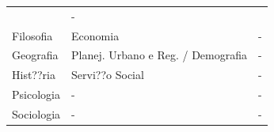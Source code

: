 \documentclass[]{article}
\begin{document}
\begin{longtable}[]{@{}lll@{}}
\begin{minipage}[t]{0.03\columnwidth}
\end{minipage} & \begin{minipage}[t]{0.03\columnwidth}\raggedright\strut
-\strut
\end{minipage}\tabularnewline
\begin{minipage}[t]{0.03\columnwidth}\raggedright\strut
Filosofia\strut
\end{minipage} & \begin{minipage}[t]{0.03\columnwidth}\raggedright\strut
Economia\strut
\end{minipage} & \begin{minipage}[t]{0.03\columnwidth}\raggedright\strut
-\strut
\end{minipage}\tabularnewline
\begin{minipage}[t]{0.03\columnwidth}\raggedright\strut
Geografia\strut
\end{minipage} & \begin{minipage}[t]{0.03\columnwidth}\raggedright\strut
Planej. Urbano e Reg. / Demografia\strut
\end{minipage} & \begin{minipage}[t]{0.03\columnwidth}\raggedright\strut
-\strut
\end{minipage}\tabularnewline
\begin{minipage}[t]{0.03\columnwidth}\raggedright\strut
Hist??ria\strut
\end{minipage} & \begin{minipage}[t]{0.03\columnwidth}\raggedright\strut
Servi??o Social\strut
\end{minipage} & \begin{minipage}[t]{0.03\columnwidth}\raggedright\strut
-\strut
\end{minipage}\tabularnewline
\begin{minipage}[t]{0.03\columnwidth}\raggedright\strut
Psicologia\strut
\end{minipage} & \begin{minipage}[t]{0.03\columnwidth}\raggedright\strut
-\strut
\end{minipage} & \begin{minipage}[t]{0.03\columnwidth}\raggedright\strut
-\strut
\end{minipage}\tabularnewline
\begin{minipage}[t]{0.03\columnwidth}\raggedright\strut
Sociologia\strut
\end{minipage} & \begin{minipage}[t]{0.03\columnwidth}\raggedright\strut
-\strut
\end{minipage} & \begin{minipage}[t]{0.03\columnwidth}\raggedright\strut
-\strut
\end{minipage}\tabularnewline
\bottomrule
\end{longtable}
\end{document}
